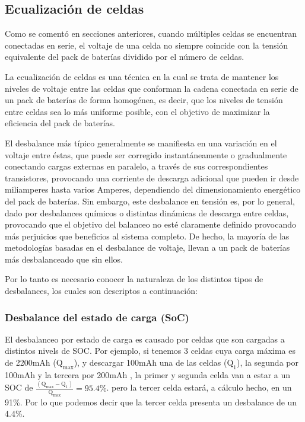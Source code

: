 \documentclass[10pt,a4paper]{article}
\begin{document}
	\subsection{Ecualización de celdas}
	
	\noindent Como se comentó en secciones anteriores, cuando múltiples celdas se encuentran conectadas en serie, el voltaje de una celda no siempre coincide con la tensión equivalente del pack de baterías dividido por el número de celdas. 
	
	\noindent La ecualización de celdas es una técnica en la cual se trata de mantener los niveles de voltaje entre las celdas que conforman la cadena conectada en serie de un pack de baterías de forma homogénea, es decir, que los niveles de tensión entre celdas sea lo más uniforme posible, con el objetivo de maximizar la eficiencia del pack de baterías.
	
	\noindent El desbalance más típico generalmente se manifiesta en una variación en el voltaje entre éstas, que puede ser corregido instantáneamente o gradualmente conectando cargas externas en paralelo, a través de sus correspondientes transistores, provocando una corriente de descarga adicional que pueden ir desde miliamperes hasta varios Amperes, dependiendo del dimensionamiento energético del pack de baterías. Sin embargo, este desbalance en tensión es, por lo general, dado por desbalances químicos o distintas dinámicas de descarga entre celdas, provocando que el objetivo del balanceo no esté claramente definido provocando más perjuicios que beneficios al sistema completo. De hecho, la mayoría de las metodologías basadas en el desbalance de voltaje, llevan a un pack de baterías más desbalanceado que sin ellos.
	
	\noindent Por lo tanto es necesario conocer la naturaleza de los distintos tipos de desbalances, los cuales son descriptos a continuación:
	
	\subsubsection{Desbalance del estado de carga (SoC)}
	
	\noindent El desbalanceo por estado de carga es causado por celdas que son cargadas a distintos nivels de \acrshort{SOC}. Por ejemplo, si tenemos 3 celdas cuya carga máxima es de 2200mAh ($\mathrm{Q_{max}}$), y descargar 100mAh una de las celdas ($\mathrm{Q_1}$), la segunda por 100mAh y la tercera por 200mAh , la primer y segunda celda van a estar a un \acrshort{SOC} de $\mathrm{\frac{(Q_{max} - Q_1)}{Q_{max}} = 95.4\%}$. pero la tercer celda estará, a cálculo hecho, en un 91\%. Por lo que podemos decir que la tercer celda presenta un desbalance de un 4.4\%. 
\end{document}
